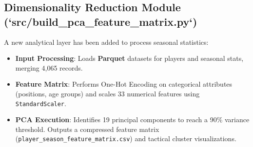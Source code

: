 \subsection{Dimensionality Reduction Module (`src/build_pca_feature_matrix.py`)}
A new analytical layer has been added to process seasonal statistics:
\begin{itemize}
    \item \textbf{Input Processing}: Loads \textbf{Parquet} datasets for players and seasonal stats, merging 4,065 records.
    \item \textbf{Feature Matrix}: Performs One-Hot Encoding on categorical attributes (positions, age groups) and scales 33 numerical features using \texttt{StandardScaler}.
    \item \textbf{PCA Execution}: Identifies 19 principal components to reach a 90\% variance threshold. Outputs a compressed feature matrix (\texttt{player\_season\_feature\_matrix.csv}) and tactical cluster visualizations.
\end{itemize}
